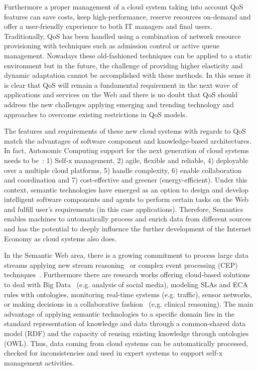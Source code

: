 Furthermore a proper management of a cloud system taking into account QoS 
features can save costs, keep high-performance, reserve resources on-demand and 
offer a user-friendly experience to both IT managers and final users. 
Traditionally, QoS has been handled using a combination of network resource 
provisioning with techniques such as admission control or active queue 
management. Nowadays these old-fashioned techniques can be applied to a static 
environment but in the future, the challenge of providing higher elasticity and 
dynamic adaptation cannot be accomplished with these methods. In this sense it 
is clear that QoS will remain a fundamental requirement in the next wave of 
applications and services on the Web and there is no doubt that QoS should 
address the new challenges applying emerging and trending technology and 
approaches to overcome existing restrictions in QoS models.

The features and requirements of these new cloud systems with regards 
to QoS~\cite{Pedersen:2011:AMQ:2114495.2115542} match the advantages of software component and 
knowledge-based architectures. In fact, Autonomic Computing support for the next generation of cloud systems 
needs to be~\cite{Conejero:2012:MSQ:2357487.2357591,Pedersen:2011:AMQ:2114495.2115542}: 
1) Self-x management, 2) agile, flexible and reliable, 4) deployable over a multiple cloud platforms, 5) handle complexity, 6) enable 
collaboration and coordination and 7) cost-effective and greener 
(energy-efficient). Under this context, semantic technologies have emerged as an 
option to design and develop intelligent software components and agents to 
perform certain tasks on the Web and fulfill user's requirements (in this case 
applications). Therefore, Semantics enables machines to automatically process 
and enrich data from different sources and has the potential to deeply influence 
the further development of the Internet Economy as cloud systems also does.

In the Semantic Web area, there is a growing commitment to process large data streams applying 
new stream reasoning~\cite{Bolles:2008:SSE:1789394.1789438,Barbieri:2010:EEC:1739041.1739095} 
or complex event processing (CEP) techniques~\cite{Anicic:2011:EUL:1963405.1963495}. Furthermore there are research works offering cloud-based 
solutions to deal with Big Data~\cite{Fan:2013:MBD:2481244.2481246} (e.g. analysis of social media), modeling SLAs and ECA rules with ontologies, 
monitoring real-time systems (e.g. traffic), sensor networks, or making decisions in a collaborative fashion~\cite{RodriGuez-GonzaLez:2012:UAP:2350799.2350907} (e.g. clinical reasoning). 
The main advantage of applying semantic technologies to a specific domain lies in the standard representation of knowledge and data through a common-shared data model (RDF) and the 
capacity of reusing existing knowledge through ontologies (OWL). Thus, data coming from cloud systems can be automatically processed, checked for inconsistencies and 
used in expert systems to support self-x management activities.

